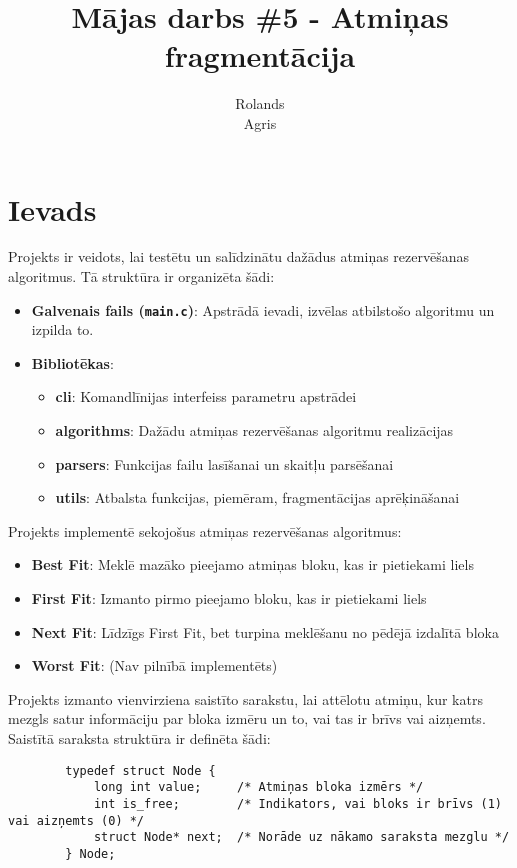 \documentclass{report}
\title{Mājas darbs \#5 - Atmiņas fragmentācija}
\author{Rolands \\ Agris}
\date{}
\begin{document}
	
	\maketitle
	
	\section{Ievads}
	
	Projekts ir veidots, lai testētu un salīdzinātu dažādus atmiņas rezervēšanas algoritmus. Tā struktūra ir organizēta šādi:
	
	\begin{itemize}
		\item \textbf{Galvenais fails (\texttt{main.c})}: Apstrādā ievadi, izvēlas atbilstošo algoritmu un izpilda to.
		\item \textbf{Bibliotēkas}:
		\begin{itemize}
			\item \textbf{cli}: Komandlīnijas interfeiss parametru apstrādei
			\item \textbf{algorithms}: Dažādu atmiņas rezervēšanas algoritmu realizācijas
			\item \textbf{parsers}: Funkcijas failu lasīšanai un skaitļu parsēšanai
			\item \textbf{utils}: Atbalsta funkcijas, piemēram, fragmentācijas aprēķināšanai
		\end{itemize}
	\end{itemize}
	
	Projekts implementē sekojošus atmiņas rezervēšanas algoritmus:
	\begin{itemize}
		\item \textbf{Best Fit}: Meklē mazāko pieejamo atmiņas bloku, kas ir pietiekami liels
		\item \textbf{First Fit}: Izmanto pirmo pieejamo bloku, kas ir pietiekami liels
		\item \textbf{Next Fit}: Līdzīgs First Fit, bet turpina meklēšanu no pēdējā izdalītā bloka
		\item \textbf{Worst Fit}: (Nav pilnībā implementēts)
	\end{itemize}
	
	Projekts izmanto vienvirziena saistīto sarakstu, lai attēlotu atmiņu, kur katrs mezgls satur informāciju par bloka izmēru un to, vai tas ir brīvs vai aizņemts. Saistītā saraksta struktūra ir definēta šādi:
	
	\begin{verbatim}
		typedef struct Node {
			long int value;     /* Atmiņas bloka izmērs */
			int is_free;        /* Indikators, vai bloks ir brīvs (1) vai aizņemts (0) */
			struct Node* next;  /* Norāde uz nākamo saraksta mezglu */
		} Node;
	\end{verbatim}
	
\end{document}
